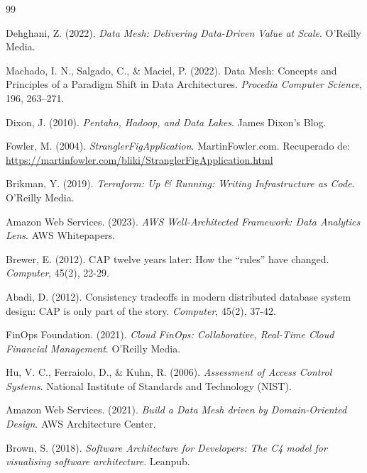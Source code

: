 \documentclass[12pt, a4paper]{article}
\begin{document}
\begin{thebibliography}{99}

Dehghani, Z. (2022). \textit{Data Mesh: Delivering Data-Driven Value at Scale}. O'Reilly Media.

Machado, I. N., Salgado, C., \& Maciel, P. (2022). Data Mesh: Concepts and Principles of a Paradigm Shift in Data Architectures. \textit{Procedia Computer Science}, 196, 263--271.

Dixon, J. (2010). \textit{Pentaho, Hadoop, and Data Lakes}. James Dixon's Blog.

Fowler, M. (2004). \textit{StranglerFigApplication}. MartinFowler.com. Recuperado de: \url{https://martinfowler.com/bliki/StranglerFigApplication.html}

Brikman, Y. (2019). \textit{Terraform: Up \& Running: Writing Infrastructure as Code}. O'Reilly Media.

Amazon Web Services. (2023). \textit{AWS Well-Architected Framework: Data Analytics Lens}. AWS Whitepapers.

Brewer, E. (2012). CAP twelve years later: How the ``rules'' have changed. \textit{Computer}, 45(2), 22-29.

Abadi, D. (2012). Consistency tradeoffs in modern distributed database system design: CAP is only part of the story. \textit{Computer}, 45(2), 37-42.

FinOps Foundation. (2021). \textit{Cloud FinOps: Collaborative, Real-Time Cloud Financial Management}. O'Reilly Media.

Hu, V. C., Ferraiolo, D., \& Kuhn, R. (2006). \textit{Assessment of Access Control Systems}. National Institute of Standards and Technology (NIST).

Amazon Web Services. (2021). \textit{Build a Data Mesh driven by Domain-Oriented Design}. AWS Architecture Center.

Brown, S. (2018). \textit{Software Architecture for Developers: The C4 model for visualising software architecture}. Leanpub.

\end{thebibliography}
\end{document}

